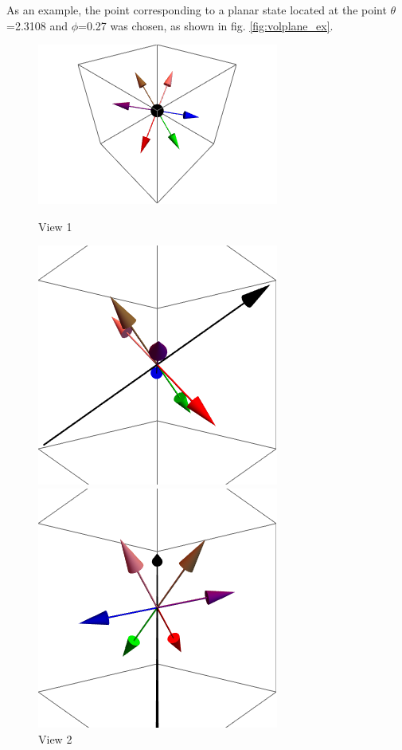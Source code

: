 As an example, the point corresponding to a planar state located at the point $\theta$=2.3108 and $\phi$=0.27 was chosen, as shown in fig. \ref{fig:volplane_ex}.

\begin{figure}
  \label{fig:volplaneex_vecs}
  \begin{minipage}[b]{0.5\linewidth}
    \centering
    \includegraphics[width=.8\linewidth]{img/th2-3108_phi0-27_view1.png} 
    \caption{View 1} 
    \vspace{4ex}
  \end{minipage}%
  \begin{minipage}[b]{0.5\linewidth}
    \centering
    \includegraphics[width=.5\linewidth]{img/th2-3108_phi0-27_view2.png} 
    \caption{View 2} 
    \vspace{4ex}
  \end{minipage} 
  \begin{minipage}[b]{0.5\linewidth}
    \centering
    \includegraphics[width=.5\linewidth]{img/th2-3108_phi0-27_view3.png} 

\end{minipage}
\end{figure}

